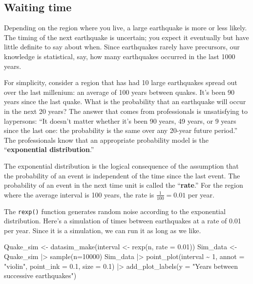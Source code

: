 \documentclass[
  letterpaper,
  DIV=11,
  numbers=noendperiod,
  oneside]{scrartcl}
\newenvironment{Shaded}{\begin{snugshade}}{\end{snugshade}}
\newcommand{\AttributeTok}[1]{\textcolor[rgb]{0.40,0.45,0.13}{#1}}
\newcommand{\DecValTok}[1]{\textcolor[rgb]{0.68,0.00,0.00}{#1}}
\newcommand{\FloatTok}[1]{\textcolor[rgb]{0.68,0.00,0.00}{#1}}
\newcommand{\FunctionTok}[1]{\textcolor[rgb]{0.28,0.35,0.67}{#1}}
\newcommand{\NormalTok}[1]{\textcolor[rgb]{0.00,0.23,0.31}{#1}}
\newcommand{\OtherTok}[1]{\textcolor[rgb]{0.00,0.23,0.31}{#1}}
\newcommand{\SpecialCharTok}[1]{\textcolor[rgb]{0.37,0.37,0.37}{#1}}
\newcommand{\StringTok}[1]{\textcolor[rgb]{0.13,0.47,0.30}{#1}}
\begin{document}
\subsection{Waiting time}\label{sec-exponential-distribution}

Depending on the region where you live, a large earthquake is more or
less likely. The timing of the next earthquake is uncertain; you expect
it eventually but have little definite to say about when. Since
earthquakes rarely have precursors, our knowledge is statistical, say,
how many earthquakes occurred in the last 1000 years.

For simplicity, consider a region that has had 10 large earthquakes
spread out over the last millenium: an average of 100 years between
quakes. It's been 90 years since the last quake. What is the probability
that an earthquake will occur in the next 20 years? The answer that
comes from professionals is unsatisfying to laypersons: ``It doesn't
matter whether it's been 90 years, 49 years, or 9 years since the last
one: the probability is the same over any 20-year future period.'' The
professionals know that an appropriate probability model is the
``\textbf{exponential distribution}.''

The exponential distribution is the logical consequence of the
assumption that the probability of an event is independent of the time
since the last event. The probability of an event in the next time unit
is called the ``\textbf{rate}.'' For the region where the average
interval is 100 years, the rate is \(\frac{1}{100} = 0.01\) per year.

The \texttt{rexp()} function generates random noise according to the
exponential distribution. Here's a simulation of times between
earthquakes at a rate of 0.01 per year. Since it is a simulation, we can
run it as long as we like.

\begin{Shaded}
\begin{Highlighting}[]
\NormalTok{Quake\_sim }\OtherTok{\textless{}{-}} \FunctionTok{datasim\_make}\NormalTok{(interval }\OtherTok{\textless{}{-}} \FunctionTok{rexp}\NormalTok{(n, }\AttributeTok{rate =} \FloatTok{0.01}\NormalTok{))}
\NormalTok{Sim\_data }\OtherTok{\textless{}{-}}\NormalTok{ Quake\_sim }\SpecialCharTok{|\textgreater{}} \FunctionTok{sample}\NormalTok{(}\AttributeTok{n=}\DecValTok{10000}\NormalTok{)}
\NormalTok{Sim\_data }\SpecialCharTok{|\textgreater{}} 
  \FunctionTok{point\_plot}\NormalTok{(interval }\SpecialCharTok{\textasciitilde{}} \DecValTok{1}\NormalTok{, }\AttributeTok{annot =} \StringTok{"violin"}\NormalTok{,}
              \AttributeTok{point\_ink =} \FloatTok{0.1}\NormalTok{, }\AttributeTok{size =} \FloatTok{0.1}\NormalTok{)  }\SpecialCharTok{|\textgreater{}}
  \FunctionTok{add\_plot\_labels}\NormalTok{(}\AttributeTok{y =} \StringTok{"Years between successive earthquakes"}\NormalTok{) }
\end{Highlighting}
\end{Shaded}
\end{document}
